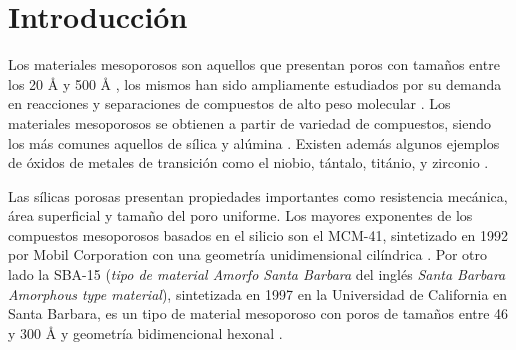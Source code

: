 \documentclass[fleqn, 12pt]{SelfArx}
\begin{document}
\flushbottom %

\maketitle %


\thispagestyle{empty} %




\section*{Introducci\'on} %

Los materiales mesoporosos son aquellos que presentan poros con tama\~nos entre los 20 \r{A} y 500 \r{A} \cite{macnaught_wilkinson_1997}, los mismos han sido ampliamente estudiados por su demanda en reacciones y separaciones de compuestos de alto peso molecular \cite{zhao_1998}. Los materiales mesoporosos se obtienen a partir de variedad de compuestos, siendo los m\'as comunes aquellos de s\'ilica y al\'umina \cite{mitra_bhaumik_paul_2008}. Existen adem\'as algunos ejemplos de \'oxidos de metales de transici\'on como el niobio, t\'antalo, tit\'anio, y zirconio \cite{lee_lu_kondo_domen_2002}\cite{noda_lee_domen_kondo_2008}\cite{mitra_bhaumik_paul_2008}\cite{parvulescu_bonnemann_parvulescu_endruschat_rufinska_lehmann_tesche_poncelet_2001}.

Las s\'ilicas porosas presentan propiedades importantes como resistencia mec\'anica, \'area superficial y tama\~no del poro uniforme. Los mayores exponentes de los compuestos mesoporosos basados en el silicio son el MCM-41, sintetizado en 1992 por Mobil Corporation con una geometr\'ia unidimensional cil\'indrica \cite{zhao_1998}. Por otro lado la SBA-15 (\textit{tipo de material Amorfo Santa Barbara} del ingl\'es \textit{Santa Barbara Amorphous type material}), sintetizada en 1997 en la Universidad de California en Santa Barbara, es un tipo de material mesoporoso con poros de tama\~nos entre 46 y 300 \r{A} y geometr\'ia bidimencional hexonal \cite{zhao_1998}.
\end{document}
